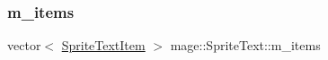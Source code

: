 \hypertarget{classmage_1_1_sprite_text_a5990cef53a24dcd6d6bf0ff550145ca4}{}\label{classmage_1_1_sprite_text_a5990cef53a24dcd6d6bf0ff550145ca4} 
\subsubsection{\texorpdfstring{m\+\_\+items}{m\_items}}
{\footnotesize\ttfamily vector$<$ \hyperlink{structmage_1_1_sprite_text_item}{Sprite\+Text\+Item} $>$ mage\+::\+Sprite\+Text\+::m\+\_\+items\hspace{0.3cm}{\ttfamily [private]}}

